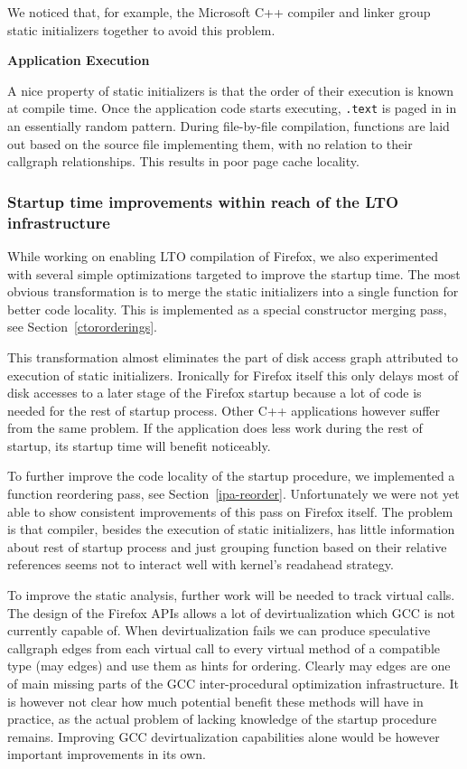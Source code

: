\documentclass[final]{ols}
\begin{document}
We noticed that, for example, the Microsoft C++ compiler and linker group static
initializers together to avoid this problem.

{\bf Application Execution}

A nice property of static initializers is that the order of their execution is
known at compile time. Once the application code starts executing, {\tt .text} is
paged in in an essentially random pattern.  During file-by-file compilation, functions are
laid out based on the source file implementing them, with no relation to their
callgraph relationships. This results in poor page cache locality.

\subsubsection{Startup time improvements within reach of the LTO infrastructure}

While working on enabling LTO compilation of Firefox, we also experimented with
several simple optimizations targeted to improve the startup time.  The most obvious
transformation is to merge the static initializers into a single function for
better code locality. This is implemented as a special constructor merging pass,
see Section~\ref{ctororderings}.

This transformation almost eliminates the part of disk access graph attributed
to execution of static initializers. Ironically for Firefox itself this only delays most
of disk accesses to a later stage of the Firefox startup because a lot of code is
needed for the rest of startup process. Other C++ applications however suffer
from the same problem. If the application does less work during the rest of
startup, its startup time will benefit noticeably.

To further improve the code locality of the startup procedure, we implemented
a function reordering pass, see Section~\ref{ipa-reorder}. Unfortunately we
were not yet able to show consistent improvements of this pass on  Firefox
itself.  The problem is that compiler, besides the execution of static initializers, has
little information about rest of startup process and just grouping function
based on their relative references seems not to interact well with kernel's
readahead strategy.

To improve the static analysis, further work will be needed to track virtual
calls.  The design of the Firefox APIs allows a lot of devirtualization which GCC is not
currently capable of. When devirtualization fails we can produce speculative callgraph
edges from each virtual call to every virtual method of a compatible type (may
edges) and use them as hints for ordering.  Clearly may edges are one
of main missing parts of the GCC inter-procedural optimization infrastructure.  It
is however not clear how much potential benefit these methods will have in practice, as
the actual problem of lacking knowledge of the startup procedure
remains. Improving GCC devirtualization capabilities alone would be however
important improvements in its own.
\end{document}
